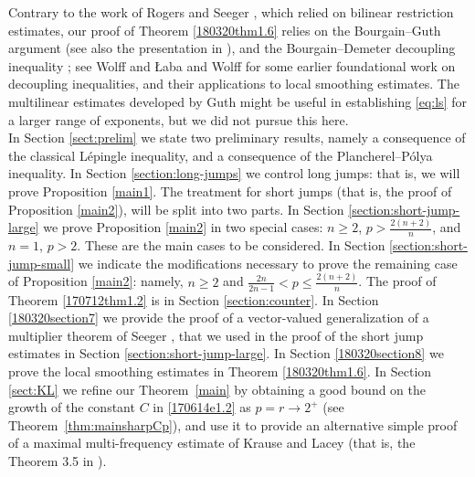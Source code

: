 \documentclass[12pt,leqno]{amsart}
\theoremstyle{plain}
\numberwithin{equation}{section}
\begin{document}
Contrary to the work of Rogers and Seeger \cite{MR2629687}, which relied on bilinear restriction estimates, our proof of Theorem \ref{180320thm1.6} relies on the Bourgain--Guth argument \cite{MR2860188} (see also the presentation in \cite{MR3592159}), and the Bourgain--Demeter decoupling inequality \cite{MR3374964}; see Wolff \cite{Wol00} and {\L}aba and Wolff \cite{LW02} for some earlier foundational work on decoupling inequalities, and their applications to local smoothing estimates. The multilinear estimates developed by Guth \cite{Guth16} might be useful in establishing \eqref{eq:ls} for a larger range of exponents, but we did not pursue this here. \\


 In Section \ref{sect:prelim} we state two preliminary results, namely a consequence of the classical L\'{e}pingle inequality, and a consequence of the Plancherel--P\'{o}lya inequality. In Section \ref{section:long-jumps} we control long jumps: that is, we will prove Proposition \ref{main1}. The treatment for short jumps (that is, the proof of Proposition \ref{main2}), will be split into two parts. In Section \ref{section:short-jump-large} we prove Proposition \ref{main2} in two special cases: $n \geq 2$, $p > \frac{2(n+2)}{n}$, and $n = 1$, $p > 2$. These are the main cases to be considered. In Section \ref{section:short-jump-small} we indicate the modifications necessary to prove the remaining case of Proposition \ref{main2}: namely, $n \geq 2$ and $\frac{2n}{2n-1}<p\leq \frac{2(n+2)}{n}$. The proof of Theorem \ref{170712thm1.2} is in Section \ref{section:counter}. In Section \ref{180320section7} we provide the proof of a vector-valued generalization of a multiplier theorem of Seeger \cite{MR955772}, that we used in the proof of the short jump estimates in Section \ref{section:short-jump-large}. In Section \ref{180320section8} we prove the local smoothing estimates in Theorem \ref{180320thm1.6}. In Section \ref{sect:KL} we refine our Theorem~\ref{main} by obtaining a good bound on the growth of the constant $C$ in \eqref{170614e1.2} as $p=r \to 2^+$ (see Theorem~\ref{thm:mainsharpCp}), and use it to provide an alternative simple proof of a maximal multi-frequency estimate of Krause and Lacey (that is, the Theorem 3.5 in \cite{MR3658135}). \\
\end{document}
